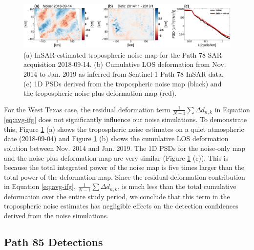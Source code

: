 \begin{figure}
	\centering 
	\includegraphics[width=0.98\linewidth]{figures/chapter6-blobs/figure_discussion_residual_defo.pdf}
	\caption{
		(a) InSAR-estimated tropospheric noise map for the Path 78 SAR acquisition 2018-09-14. 
		(b) Cumulative LOS deformation from Nov. 2014 to Jan. 2019 as inferred from Sentinel-1 Path 78 InSAR data.
		(c) 1D PSDs derived from the tropospheric noise map (black) and the tropospheric noise plus deformation map (red).
	}
	\label{fig:discussion-residual-defo}
\end{figure}


For the West Texas case, the residual deformation term $  \frac{1}{N-1}  \sum  \Delta d_{n,k} $ in Equation \eqref{eq:avg-ifg} does not significantly influence our noise simulations. To demonstrate this, Figure \ref{fig:discussion-residual-defo} (a) shows the tropospheric noise estimates on a quiet atmospheric date (2018-09-04) and Figure  \ref{fig:discussion-residual-defo} (b) shows the cumulative LOS deformation solution between  Nov. 2014 and Jan. 2019. The 1D PSDs for the noise-only map and the noise plus deformation map are very similar (Figure \ref{fig:discussion-residual-defo} (c)). This is because the total integrated power of the noise map is five times larger than the total power of the deformation map. Since the residual deformation contribution in Equation \eqref{eq:avg-ifg}, $ \frac{1}{N-1}  \sum  \Delta d_{n,k} $, is much less than the total cumulative deformation over the entire study period, we conclude that this term in the tropospheric noise estimates has negligible effects on the detection confidences derived from the noise simulations.



\subsection{Path 85 Detections}
\label{subsec:discussion-path85}


